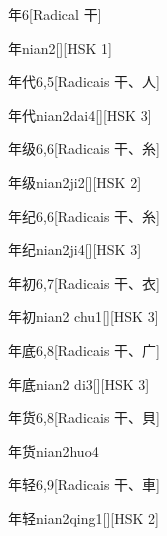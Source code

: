 \begin{entry}{年}{6}[Radical ⼲]
  \begin{phonetics}{年}{nian2}[][HSK 1]
  \end{phonetics}
\end{entry}

\begin{entry}{年代}{6,5}[Radicais ⼲、⼈]
  \begin{phonetics}{年代}{nian2dai4}[][HSK 3]
  \end{phonetics}
\end{entry}

\begin{entry}{年级}{6,6}[Radicais ⼲、⽷]
  \begin{phonetics}{年级}{nian2ji2}[][HSK 2]
  \end{phonetics}
\end{entry}

\begin{entry}{年纪}{6,6}[Radicais ⼲、⽷]
  \begin{phonetics}{年纪}{nian2ji4}[][HSK 3]
  \end{phonetics}
\end{entry}

\begin{entry}{年初}{6,7}[Radicais ⼲、⾐]
  \begin{phonetics}{年初}{nian2 chu1}[][HSK 3]
  \end{phonetics}
\end{entry}

\begin{entry}{年底}{6,8}[Radicais ⼲、⼴]
  \begin{phonetics}{年底}{nian2 di3}[][HSK 3]
  \end{phonetics}
\end{entry}

\begin{entry}{年货}{6,8}[Radicais ⼲、⾙]
  \begin{phonetics}{年货}{nian2huo4}
  \end{phonetics}
\end{entry}

\begin{entry}{年轻}{6,9}[Radicais ⼲、⾞]
  \begin{phonetics}{年轻}{nian2qing1}[][HSK 2]
  \end{phonetics}
\end{entry}

